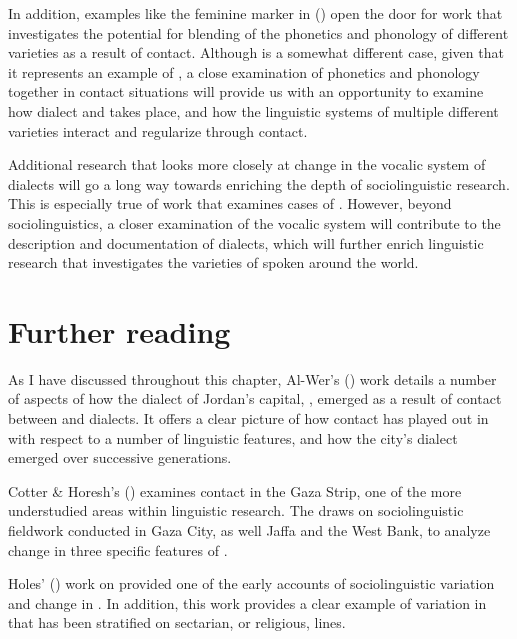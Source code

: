\documentclass[output=paper]{langsci/langscibook}
\begin{document}
  In addition, examples like the feminine  marker in  (\citealt{Al-Wer2007}) open the door for  work that investigates the potential for blending of the phonetics and phonology of different  varieties as a result of contact. Although  is a somewhat different case, given that it represents an example of  , a close examination of phonetics and phonology together in contact situations will provide us with an opportunity to examine how dialect  and  takes place, and how the linguistic systems of multiple different  varieties interact and regularize through contact. 

  Additional research that looks more closely at change in the vocalic system of  dialects will go a long way towards enriching the depth of  sociolinguistic research. This is especially true of work that examines cases of . However, beyond sociolinguistics, a closer examination of the vocalic system will contribute to the description and documentation of  dialects, which will further enrich linguistic research that investigates the varieties of  spoken around the world. 

\section*{Further reading}
\begin{furtherreading}
\item[As I have discussed throughout this chapter,]\sloppy Al-Wer's (\citeyear{Al-Wer2007}) work details a number of aspects of how the dialect of Jordan’s capital, , emerged as a result of contact between  and  dialects. It offers a clear picture of how contact has played out in  with respect to a number of linguistic features, and how the city’s dialect emerged over successive generations. 
\item[Cotter \& Horesh’s (\citeyear{CotterHoresh2015})]  examines contact in the Gaza Strip, one of the more understudied areas within  linguistic research. The  draws on sociolinguistic fieldwork conducted in Gaza City, as well Jaffa and the West Bank, to analyze change in three specific features of  .
\item[Holes' (\citeyear{Holes1987})] work on  provided one of the early accounts of sociolinguistic variation and change in . In addition, this work provides a clear example of variation in  that has been stratified on sectarian, or religious, lines. 
\end{furtherreading}
\end{document}

